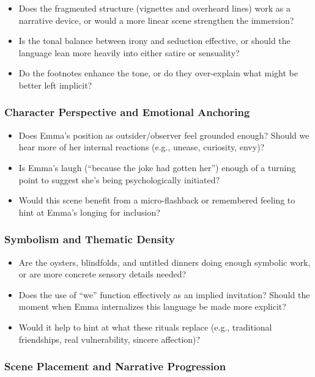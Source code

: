\begin{itemize}
  \item Does the fragmented structure (vignettes and overheard lines) work as a narrative device, or would a more linear scene strengthen the immersion?
  \item Is the tonal balance between irony and seduction effective, or should the language lean more heavily into either satire or sensuality?
  \item Do the footnotes enhance the tone, or do they over-explain what might be better left implicit?
\end{itemize}

\subsubsection*{Character Perspective and Emotional Anchoring}

\begin{itemize}
  \item Does Emma’s position as outsider/observer feel grounded enough? Should we hear more of her internal reactions (e.g., unease, curiosity, envy)?
  \item Is Emma’s laugh (“because the joke had gotten her”) enough of a turning point to suggest she’s being psychologically initiated?
  \item Would this scene benefit from a micro-flashback or remembered feeling to hint at Emma’s longing for inclusion?
\end{itemize}

\subsubsection*{Symbolism and Thematic Density}

\begin{itemize}
  \item Are the oysters, blindfolds, and untitled dinners doing enough symbolic work, or are more concrete sensory details needed?
  \item Does the use of “we” function effectively as an implied invitation? Should the moment when Emma internalizes this language be made more explicit?
  \item Would it help to hint at what these rituals replace (e.g., traditional friendships, real vulnerability, sincere affection)?
\end{itemize}

\subsubsection*{Scene Placement and Narrative Progression}

